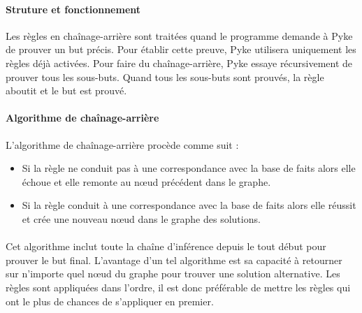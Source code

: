 \documentclass {report}
\begin{document}
\paragraph{Struture et fonctionnement}
Les règles en chaînage-arrière sont traitées quand le programme demande à Pyke de prouver un but précis. Pour établir cette preuve, Pyke utilisera uniquement les règles déjà activées. Pour faire du chaînage-arrière, Pyke essaye récursivement de prouver tous les sous-buts. Quand tous les sous-buts sont prouvés, la règle aboutit et le but est prouvé.

\paragraph{Algorithme de chaînage-arrière}
    L'algorithme de chaînage-arrière procède comme suit : 
\begin{itemize}
    \item Si la règle ne conduit pas à une correspondance avec la base de faits alors elle échoue et elle remonte au nœud précédent dans le graphe.
    \item Si la règle conduit à une correspondance avec la base de faits alors elle réussit et crée une nouveau nœud dans le graphe des solutions.
\end{itemize}

\paragraph{}
Cet algorithme inclut toute la chaîne d'inférence depuis le tout début pour prouver le but final. L'avantage d'un tel algorithme est sa capacité à retourner sur n'importe quel nœud du graphe pour trouver une solution alternative. Les règles sont appliquées dans l'ordre, il est donc préférable de mettre les règles qui ont le plus de chances de s'appliquer en premier.
\end{document}
